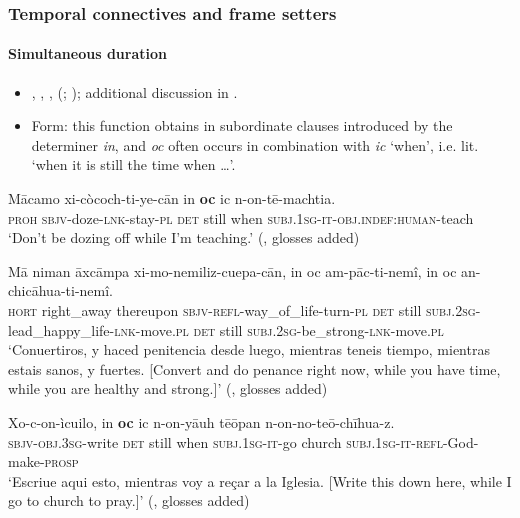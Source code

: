 \subsubsection{Temporal connectives and frame setters}

\paragraph{Simultaneous duration}
\label{appendixClassicalNahuatlWhile}
\begin{itemize}
	\item \textcite[452, 516, 525]{Andrews2003}, \textcite[503]{Carochi1645}, \textcite[180]{Karttunen1992}, \citeauthor{Launey1986} (\citeyear[1268–1269]{Launey1986}; \citeyear[64–65, 365–366]{LauneyMackay2011}); additional discussion in \textcite[309]{vanBaar1997}.
	\item Form: this function obtains in subordinate clauses introduced by the determiner \textit{in}, and \textit{oc} often occurs in combination with \textit{ic} \lq when', i.e. lit. \lq when it is still the time when …\rq{}.
\end{itemize}
\begin{exe}
	\ex\label{exAppendixClassicalNahuatlWhile1}
	\gll Mācamo xi-còcoch-ti-ye-cān in \textbf{oc} ic n-on-tē-machtia.\\
	\textsc{proh} \textsc{sbjv}-doze-\textsc{lnk}-stay-\textsc{pl} \textsc{det} still when \textsc{subj}.1\textsc{sg}-\textsc{it}-\textsc{obj}.\textsc{indef}:\textsc{human}-teach\\
	\glt \lq Don’t be dozing off while I’m teaching.\rq{ }(\cite[366]{LauneyMackay2011}, glosses added)
	
	\ex\label{exAppendixClassicalNahuatlWhile2}
	\gll Mā niman āxcāmpa xi-mo-nemiliz-cuepa-cān, in oc am-pāc-ti-nemî, in oc an-chicāhua-ti-nemî.\\
	\textsc{hort} right\_away thereupon \textsc{sbjv}-\textsc{refl}-way\_of\_life-turn-\textsc{pl} \textsc{det} still \textsc{subj}.2\textsc{sg}-lead\_happy\_life-\textsc{lnk}-move.\textsc{pl} \textsc{det} still \textsc{subj}.2\textsc{sg}-be\_strong-\textsc{lnk}-move.\textsc{pl}\\
	\glt \lq Conuertiros, y haced penitencia desde luego, mientras teneis tiempo, mientras estais sanos, y fuertes. [Convert and do penance right now, while you have time, while you are healthy and strong.]\rq{ }(\cite[503]{Carochi1645}, glosses added)

	\ex\label{exAppendixClassicalNahuatlWhile3}
	\gll Xo-c-on-ìcuilo, in \textbf{oc} ic n-on-yāuh tēōpan n-on-no-teō-chīhua-z.\\
	\textsc{sbjv}-\textsc{obj}.3\textsc{sg}-write \textsc{det} still when \textsc{subj}.1\textsc{sg}-\textsc{it}-go church \textsc{subj}.1\textsc{sg}-\textsc{it}-\textsc{refl}-God-make-\textsc{prosp}\\
	\glt \lq Escriue aqui esto, mientras voy a reçar a la Iglesia. [Write this down here, while I go to church to pray.]' (\cite[503]{Carochi1645}, glosses added)
\end{exe}





